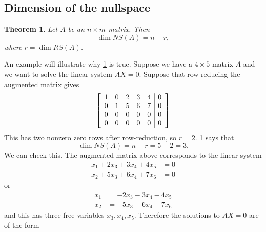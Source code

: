 \documentclass[10pt]{article}
\newenvironment{augmentedmatrix}[1] %
{\left[\begin{array}{#1}}
    {\end{array}\right]}
\newtheorem{theorem}{Theorem}
\theoremstyle{definition}
\begin{document}
\subsection{Dimension of the nullspace}
\begin{theorem}
  \label{thm:dim-of-nullspace-is-n-r}
  Let $A$ be an $n\times m$ matrix. Then
  \begin{equation*}
    \dim NS(A) = n-r,
  \end{equation*}
  where $r=\dim RS(A)$.
\end{theorem}
An example will illustrate why \cref{thm:dim-of-nullspace-is-n-r} is true.
Suppose we have a $4\times 5$ matrix $A$ and we want to solve the linear
system $AX=0$. Suppose that row-reducing the augmented matrix gives
\begin{equation*}
  \begin{augmentedmatrix}{ccccc|c}
    1&0&2&3&4&0\\
    0&1&5&6&7&0\\
    0&0&0&0&0&0\\
    0&0&0&0&0&0\\
  \end{augmentedmatrix}
\end{equation*}
This has two nonzero zero rows after row-reduction, so $r=2$.
\cref{thm:dim-of-nullspace-is-n-r} says that
\begin{equation*}
  \dim NS(A)=n-r=5-2=3.
\end{equation*}
We can check this. The augmented matrix above corresponds to the linear system
\begin{align*}
  x_{1}+2x_{3}+3x_{4}+4x_{5}&=0\\
  x_{2}+5x_{3}+6x_{4}+7x_{6}&=0
\end{align*}
or
\begin{align*}
  x_{1}&=-2x_{3}-3x_{4}-4x_{5}\\
  x_{2}&=-5x_{3}-6x_{4}-7x_{6}
\end{align*}
and this has three free variables $x_{3},x_{4},x_{5}$. Therefore the solutions
to $AX=0$ are of the form
\end{document}
